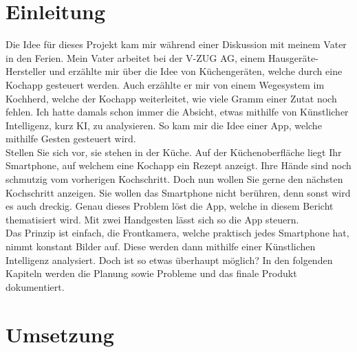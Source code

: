 \documentclass[12pt]{article}
\begin{document}
\section{Einleitung}
Die Idee für dieses Projekt kam mir während einer Diskussion mit meinem Vater in den Ferien. Mein Vater arbeitet bei der V-ZUG AG, einem Hausgeräte-Hersteller und erzählte mir über die Idee von Küchengeräten, welche durch eine Kochapp gesteuert werden. Auch erzählte er mir von einem Wegesystem im Kochherd, welche der Kochapp weiterleitet, wie viele Gramm einer Zutat noch fehlen. Ich hatte damals schon immer die Absicht, etwas mithilfe von Künstlicher Intelligenz, kurz KI, zu analysieren. So kam mir die Idee einer App, welche mithilfe Gesten gesteuert wird. \\ Stellen Sie sich vor, sie stehen in der Küche. Auf der Küchenoberfläche liegt Ihr Smartphone, auf welchem eine Kochapp ein Rezept anzeigt. Ihre Hände sind noch schmutzig vom vorherigen Kochschritt. Doch nun wollen Sie gerne den nächsten Kochschritt anzeigen. Sie wollen das Smartphone nicht berühren, denn sonst wird es auch dreckig. Genau dieses Problem löst die App, welche in diesem Bericht thematisiert wird. Mit zwei Handgesten lässt sich so die App steuern.\\ Das Prinzip ist einfach, die Frontkamera, welche praktisch jedes Smartphone hat, nimmt konstant Bilder auf. Diese werden dann mithilfe einer Künstlichen Intelligenz analysiert. Doch ist so etwas überhaupt möglich? In den folgenden Kapiteln werden die Planung sowie Probleme und das finale Produkt dokumentiert. 


\section{Umsetzung}
\end{document}
